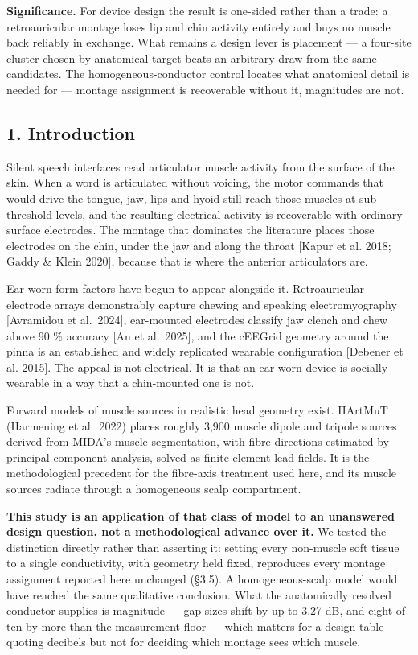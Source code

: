 \documentclass[
  11pt,
]{article}
\begin{document}
\textbf{Significance.} For device design the result is one-sided rather than a
trade: a retroauricular montage loses lip and chin activity entirely and buys no
muscle back reliably in exchange. What remains a design lever is placement --- a
four-site cluster chosen by anatomical target beats an arbitrary draw from the
same candidates. The
homogeneous-conductor control locates what anatomical detail is needed for ---
montage assignment is recoverable without it, magnitudes are not.

\subsection{1. Introduction}\label{introduction}

Silent speech interfaces read articulator muscle activity from the surface of
the skin. When a word is articulated without voicing, the motor commands that
would drive the tongue, jaw, lips and hyoid still reach those muscles at
sub-threshold levels, and the resulting electrical activity is recoverable with
ordinary surface electrodes. The montage that dominates the literature places
those electrodes on the chin, under the jaw and along the throat {[}Kapur et al.
2018; Gaddy \& Klein 2020{]}, because that is where the anterior articulators are.

Ear-worn form factors have begun to appear alongside it. Retroauricular
electrode arrays demonstrably capture chewing and speaking electromyography
{[}Avramidou et al.~2024{]}, ear-mounted electrodes classify jaw clench and chew
above 90 \% accuracy {[}An et al.~2025{]}, and the cEEGrid geometry around the pinna
is an established and widely replicated wearable configuration {[}Debener et al.
2015{]}. The appeal is not electrical. It is that an ear-worn device is socially
wearable in a way that a chin-mounted one is not.

Forward models of muscle sources in realistic head geometry exist. HArtMuT
(Harmening et al.~2022) places roughly 3,900 muscle dipole and tripole sources
derived from MIDA's muscle segmentation, with fibre directions estimated by
principal component analysis, solved as finite-element lead fields. It is the
methodological precedent for the fibre-axis treatment used here, and its
muscle sources radiate through a homogeneous scalp compartment.

\textbf{This study is an application of that class of model to an unanswered design
question, not a methodological advance over it.} We tested the distinction
directly rather than asserting it: setting every non-muscle soft tissue to a
single conductivity, with geometry held fixed, reproduces every montage
assignment reported here unchanged (§3.5). A homogeneous-scalp model would
have reached the same qualitative conclusion. What the anatomically resolved
conductor supplies is magnitude --- gap sizes shift by up to 3.27 dB, and eight
of ten by more than the measurement floor --- which matters for a design table
quoting decibels but not for deciding which montage sees which muscle.
\end{document}

